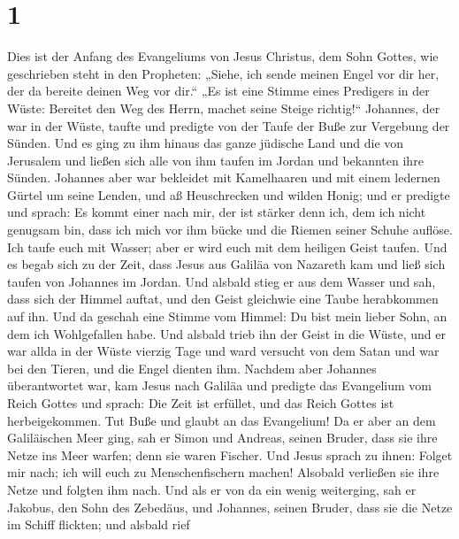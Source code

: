 \hypertarget{section}{%
\section{1}\label{section}}

 Dies ist der Anfang des Evangeliums von Jesus Christus, dem
Sohn Gottes,  wie geschrieben steht in den Propheten:
„Siehe, ich sende meinen Engel vor dir her, der da bereite deinen Weg
vor dir.``  „Es ist eine Stimme eines Predigers in der
Wüste: Bereitet den Weg des Herrn, machet seine Steige richtig!{}``
 Johannes, der war in der Wüste, taufte und predigte von der
Taufe der Buße zur Vergebung der Sünden.  Und es ging zu ihm
hinaus das ganze jüdische Land und die von Jerusalem und ließen sich
alle von ihm taufen im Jordan und bekannten ihre Sünden. 
Johannes aber war bekleidet mit Kamelhaaren und mit einem ledernen
Gürtel um seine Lenden, und aß Heuschrecken und wilden Honig;
 und er predigte und sprach: Es kommt einer nach mir, der
ist stärker denn ich, dem ich nicht genugsam bin, dass ich mich vor ihm
bücke und die Riemen seiner Schuhe auflöse.  Ich taufe euch
mit Wasser; aber er wird euch mit dem heiligen Geist taufen.
 Und es begab sich zu der Zeit, dass Jesus aus Galiläa von
Nazareth kam und ließ sich taufen von Johannes im Jordan. 
Und alsbald stieg er aus dem Wasser und sah, dass sich der Himmel
auftat, und den Geist gleichwie eine Taube herabkommen auf ihn.
 Und da geschah eine Stimme vom Himmel: Du bist mein lieber
Sohn, an dem ich Wohlgefallen habe.  Und alsbald trieb ihn
der Geist in die Wüste,  und er war allda in der Wüste
vierzig Tage und ward versucht von dem Satan und war bei den Tieren, und
die Engel dienten ihm.  Nachdem aber Johannes überantwortet
war, kam Jesus nach Galiläa und predigte das Evangelium vom Reich Gottes
 und sprach: Die Zeit ist erfüllet, und das Reich Gottes
ist herbeigekommen. Tut Buße und glaubt an das Evangelium! 
Da er aber an dem Galiläischen Meer ging, sah er Simon und Andreas,
seinen Bruder, dass sie ihre Netze ins Meer warfen; denn sie waren
Fischer.  Und Jesus sprach zu ihnen: Folget mir nach; ich
will euch zu Menschenfischern machen!  Alsobald verließen
sie ihre Netze und folgten ihm nach.  Und als er von da ein
wenig weiterging, sah er Jakobus, den Sohn des Zebedäus, und Johannes,
seinen Bruder, dass sie die Netze im Schiff flickten; und alsbald rief
